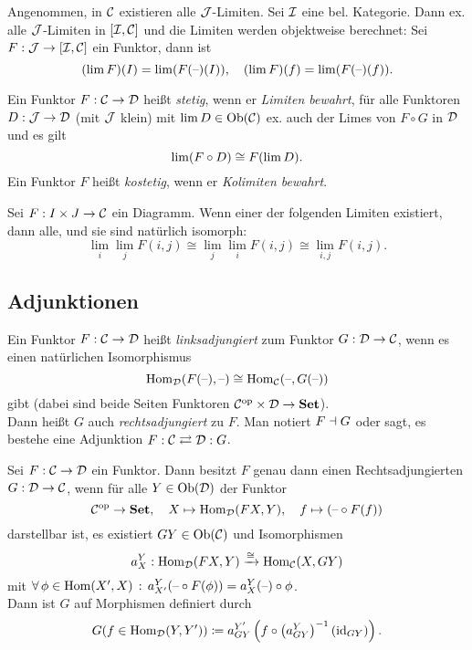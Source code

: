 \documentclass{cheat-sheet}
\begin{document}
\begin{bem}
  Angenommen, in $\mathcal{C}$ existieren alle $\mathcal{J}$-Limiten.
  Sei $\mathcal{I}$ eine bel. Kategorie.
  Dann ex. alle $\mathcal{J}$-Limiten in $[\mathcal{I}, \mathcal{C}]$ und die Limiten werden objektweise berechnet:
  Sei $F : \mathcal{J} \to [\mathcal{I}, \mathcal{C}]$ ein Funktor, dann ist
  \[
    (\lim F)(I) = \lim (F(\text{--})(I)), \quad
    (\lim F)(f) = \lim (F(\text{--})(f)).
  \]
\end{bem}

\begin{defn}
  Ein Funktor $F : \mathcal{C} \to \mathcal{D}$ heißt \emph{stetig}, wenn er \emph{Limiten bewahrt}, \dh{} für alle Funktoren $D : \mathcal{J} \to \mathcal{D}$ (mit $\mathcal{J}$ klein) mit $\lim D \in \operatorname{Ob}(\mathcal{C})$ ex. auch der Limes von $F \circ G$ in $\mathcal{D}$ und es gilt
  \[ \lim (F \circ D) \cong F(\lim D). \]
  Ein Funktor $F$ heißt \emph{kostetig}, wenn er \emph{Kolimiten bewahrt}.
\end{defn}

\begin{satz}
  Sei $F : I \times J \to \mathcal{C}$ ein Diagramm. Wenn einer der folgenden Limiten existiert, dann alle, und sie sind natürlich isomorph:
  \[ \lim_i \lim_j F(i, j) \cong \lim_j \lim_i F(i, j) \cong \lim_{i,j} F(i, j). \]
\end{satz}

\begin{samepage}
  \subsection{Adjunktionen}
\end{samepage}

\begin{defn}
  Ein Funktor $F : \mathcal{C} \to \mathcal{D}$ heißt \emph{linksadjungiert} zum Funktor $G : \mathcal{D} \to \mathcal{C}$, wenn es einen natürlichen Isomorphismus
  \[
    \operatorname{Hom}_{\mathcal{D}}(F(\text{--}), \text{--}) \cong \operatorname{Hom}_{\mathcal{C}}(\text{--}, G(\text{--}))
  \]
  gibt (dabei sind beide Seiten Funktoren $\mathcal{C}^{\mathrm{op}} \times \mathcal{D} \to \mathbf{Set}$). \\
  Dann heißt $G$ auch \emph{rechtsadjungiert} zu $F$. Man notiert $F \dashv G$ oder sagt, es bestehe eine Adjunktion \enspace $F : \mathcal{C} \rightleftarrows \mathcal{D} : G$.
\end{defn}

\begin{bem}
  Sei $F : \mathcal{C} \to \mathcal{D}$ ein Funktor.
  Dann besitzt $F$ genau dann einen Rechtsadjungierten $G : \mathcal{D} \to \mathcal{C}$, wenn für alle $Y \in \operatorname{Ob}(\mathcal{D})$ der Funktor
  \[
    \mathcal{C}^{\mathrm{op}} \to \mathbf{Set}, \quad
    X \mapsto \operatorname{Hom}_{\mathcal{D}}(FX, Y), \quad
    f \mapsto (\text{--} \circ F(f))
  \]
  darstellbar ist, \dh{} es existiert $GY \in \operatorname{Ob}(\mathcal{C})$ und Isomorphismen
  \[ a^Y_X : \operatorname{Hom}_{\mathcal{D}}(FX, Y) \xrightarrow{\cong} \operatorname{Hom}_{\mathcal{C}}(X, GY) \]
  mit $\forall \, {\phi \in \operatorname{Hom}(X', X)} \,:\, a^Y_{X'}(\text{--} \circ F(\phi)) = a^Y_X(\text{--}) \circ \phi$. \\
  Dann ist $G$ auf Morphismen definiert durch
  \[ G(f \in \operatorname{Hom}_{\mathcal{D}}(Y, Y')) \coloneqq a^{Y'}_{GY} \left( f \circ \left( a^Y_{GY} \right)^{-1} (\operatorname{id}_{GY}) \right). \]
\end{bem}
\end{document}
